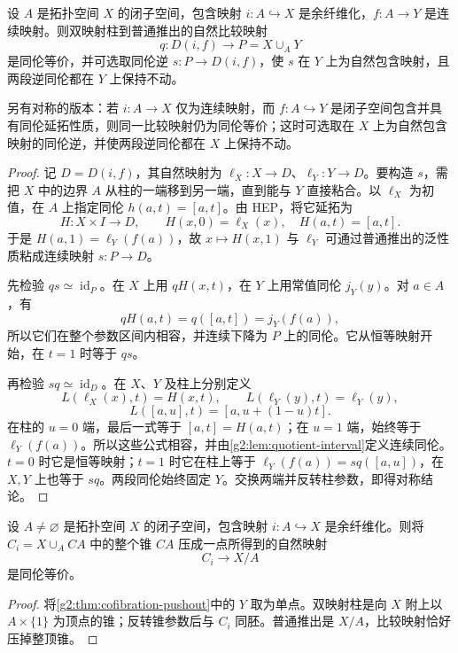 \begin{theorem}\label{g2:thm:cofibration-pushout}
	设 \(A\) 是拓扑空间 \(X\) 的闭子空间，包含映射 \(i:A\hookrightarrow X\) 是余纤维化，\(f:A\to Y\) 是连续映射。则双映射柱到普通推出的自然比较映射
	\[
		q:D(i,f)\longrightarrow P=X\cup_A Y
	\]
	是同伦等价，并可选取同伦逆 \(s:P\to D(i,f)\)，使 \(s\) 在 \(Y\) 上为自然包含映射，且两段逆同伦都在 \(Y\) 上保持不动。

	另有对称的版本：若 \(i:A\to X\) 仅为连续映射，而 \(f:A\hookrightarrow Y\) 是闭子空间包含并具有同伦延拓性质，则同一比较映射仍为同伦等价；这时可选取在 \(X\) 上为自然包含映射的同伦逆，并使两段逆同伦都在 \(X\) 上保持不动。
\end{theorem}
\begin{proof}
	记 \(D=D(i,f)\)，其自然映射为 \(\ell_X:X\to D\)、\(\ell_Y:Y\to D\)。要构造 \(s\)，需把 \(X\) 中的边界 \(A\) 从柱的一端移到另一端，直到能与 \(Y\) 直接粘合。以 \(\ell_X\) 为初值，在 \(A\) 上指定同伦 \(h(a,t)=[a,t]\)。由 HEP，将它延拓为
	\[
		H:X\times I\to D,\qquad
		H(x,0)=\ell_X(x),\quad H(a,t)=[a,t].
	\]
	于是 \(H(a,1)=\ell_Y(f(a))\)，故 \(x\mapsto H(x,1)\) 与 \(\ell_Y\) 可通过普通推出的泛性质粘成连续映射 \(s:P\to D\)。

	先检验 \(qs\simeq\operatorname{id}_P\)。在 \(X\) 上用 \(qH(x,t)\)，在 \(Y\) 上用常值同伦 \(j_Y(y)\)。对 \(a\in A\)，有
	\[
		qH(a,t)=q([a,t])=j_Y(f(a)),
	\]
	所以它们在整个参数区间内相容，并连续下降为 \(P\) 上的同伦。它从恒等映射开始，在 \(t=1\) 时等于 \(qs\)。

	再检验 \(sq\simeq\operatorname{id}_D\)。在 \(X\)、\(Y\) 及柱上分别定义
	\[
		L(\ell_X(x),t)=H(x,t),\qquad
		L(\ell_Y(y),t)=\ell_Y(y),
	\]
	\[
		L([a,u],t)=[a,u+(1-u)t].
	\]
	在柱的 \(u=0\) 端，最后一式等于 \([a,t]=H(a,t)\)；在 \(u=1\) 端，始终等于 \(\ell_Y(f(a))\)。所以这些公式相容，并由\cref{g2:lem:quotient-interval}定义连续同伦。\(t=0\) 时它是恒等映射；\(t=1\) 时它在柱上等于 \(\ell_Y(f(a))=sq([a,u])\)，在 \(X,Y\) 上也等于 \(sq\)。两段同伦始终固定 \(Y\)。交换两端并反转柱参数，即得对称结论。
\end{proof}

\begin{corollary}\label{g2:cor:mapping-cone-relative-quotient}
	设 \(A\ne\varnothing\) 是拓扑空间 \(X\) 的闭子空间，包含映射 \(i:A\hookrightarrow X\) 是余纤维化。则将 \(C_i=X\cup_A CA\) 中的整个锥 \(CA\) 压成一点所得到的自然映射
	\[
		C_i\longrightarrow X/A
	\]
	是同伦等价。
\end{corollary}
\begin{proof}
	将\cref{g2:thm:cofibration-pushout}中的 \(Y\) 取为单点。双映射柱是向 \(X\) 附上以 \(A\times\{1\}\) 为顶点的锥；反转锥参数后与 \(C_i\) 同胚。普通推出是 \(X/A\)，比较映射恰好压掉整顶锥。
\end{proof}

